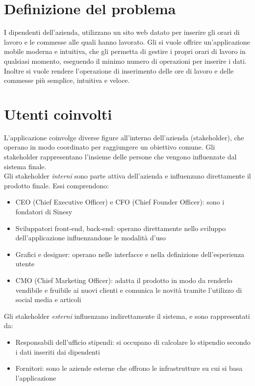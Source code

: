 \documentclass[12pt]{report}
\begin{document}
\section{Definizione del problema}
I dipendenti dell'azienda, utilizzano un sito web datato per inserire gli orari di lavoro e le commesse alle quali hanno lavorato. Gli si vuole offrire un'applicazione mobile moderna e intuitiva, che gli permetta di gestire i propri orari di lavoro in qualsiasi momento, eseguendo il minimo numero di operazioni per inserire i dati. Inoltre si vuole rendere l'operazione di inserimento delle ore di lavoro e delle commesse più semplice, intuitiva e veloce.
\section{Utenti coinvolti}
L'applicazione coinvolge diverse figure all'interno dell'azienda (stakeholder), che operano in modo coordinato per raggiungere un obiettivo comune. Gli stakeholder rappresentano l'insieme delle persone che vengono influenzate dal sistema finale.\\
Gli stakeholder \textit{interni} sono parte attiva dell'azienda e influenzano direttamente il prodotto finale. Essi comprendono:
\begin{itemize}
	\item CEO (Chief Executive Officer) e CFO (Chief Founder Officer): sono i fondatori di Sinesy
	\item Sviluppatori front-end, back-end: operano direttamente nello sviluppo dell'applicazione influenzandone le modalità d'uso
	\item Grafici e designer: operano nelle interfacce e nella definizione dell'esperienza utente
	\item CMO (Chief Marketing Officer): adatta il prodotto in modo da renderlo vendibile e fruibile ai nuovi clienti e comunica le novità tramite l'utilizzo di social media e articoli
\end{itemize}
Gli stakeholder \textit{esterni} influenzano indirettamente il sistema, e sono rappresentati da:
\begin{itemize}
	\item Responsabili dell'ufficio stipendi: si occupano di calcolare lo stipendio secondo i dati inseriti dai dipendenti
	\item Fornitori: sono le aziende esterne che offrono le infrastrutture su cui si basa l'applicazione
\end{itemize}
\end{document}
